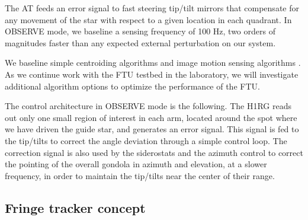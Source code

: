 The AT feeds an error signal to fast steering tip/tilt mirrors that compensate for any movement of the star with respect to a given location in each quadrant. In OBSERVE mode, we baseline a sensing frequency of 100 Hz, two orders of magnitudes faster than any expected external perturbation on our system.

We baseline simple centroiding algorithms and image motion sensing algorithms \citep{Hardy:1998ul}. As we continue work with the FTU testbed in the laboratory, we will investigate additional algorithm options to optimize the performance of the FTU.


The control architecture in OBSERVE mode is the following. The H1RG reads out only one small region of interest in each arm, located around the spot where we have driven the guide star, and generates an error signal. This signal is fed to the tip/tilts to correct the angle deviation through a simple control loop. The correction signal is also used by the siderostats and the azimuth control to correct the pointing of the overall gondola in azimuth and elevation, at a slower frequency, in order to maintain the tip/tilts near the center of their range. 


\subsection{Fringe tracker concept}\label{subsec:FRINGETRACKER}


